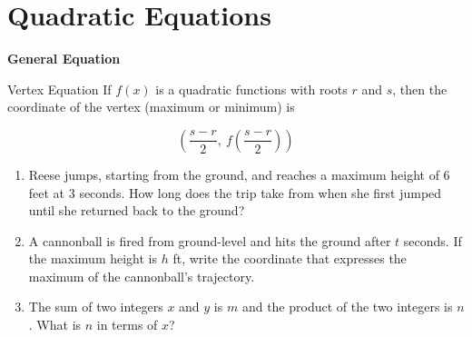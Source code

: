 \section{Quadratic Equations}

\bigskip
\textbf{General Equation}

\bigskip
\begin{equationbox}{Vertex Equation}
If $f(x)$ is a quadratic functions with roots $r$ and $s$, then the coordinate of the vertex (maximum or minimum) is

\[\left(\frac{s-r}{2},\ f\left(\frac{s-r}{2}\right)\right)\]

\end{equationbox}

\bigskip
\begin{enumerate}[labelindent=*,style=multiline,leftmargin=*,label=\textbf{Example \arabic*:}]
\item Reese jumps, starting from the ground, and reaches a maximum height of 6 feet at 3 seconds. How long does the trip take from when she first jumped until she returned back to the ground?

\vfill\item A cannonball is fired from ground-level and hits the ground after $t$ seconds. If the maximum height is $h$ ft, write the coordinate that expresses the maximum of the cannonball's trajectory.

\vfill\item The sum of two integers $x$ and $y$ is $m$ and the product of the two integers is $n$. What is $n$ in terms of $x$?
\end{enumerate}

